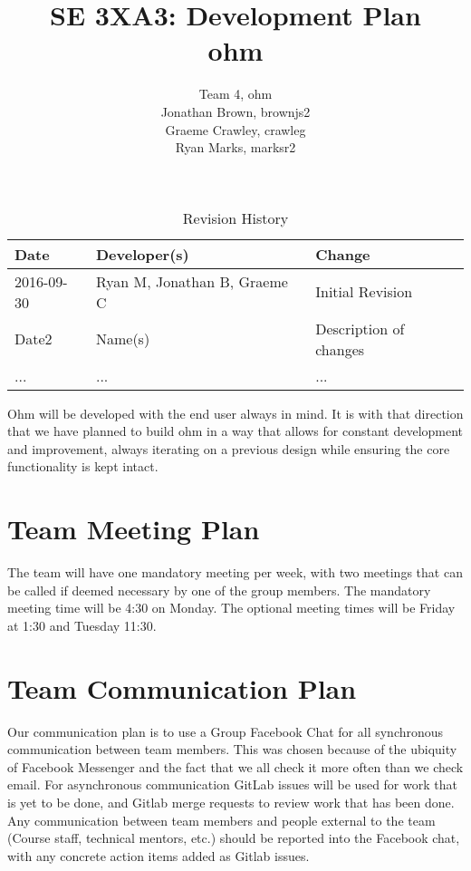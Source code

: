 \documentclass{article}
\title{SE 3XA3: Development Plan \\ohm}
\author{Team 4, ohm
		\\Jonathan Brown, brownjs2
		\\Graeme Crawley, crawleg
		\\Ryan Marks, marksr2
}
\date{}
\begin{document}
\begin{table}[hp]
\caption{Revision History} \label{TblRevisionHistory}
\begin{tabularx}{\textwidth}{llX}
\toprule
\textbf{Date} & \textbf{Developer(s)} & \textbf{Change}\\
\midrule
2016-09-30 & Ryan M, Jonathan B, Graeme C & Initial Revision\\
Date2 & Name(s) & Description of changes\\
... & ... & ...\\
\bottomrule
\end{tabularx}
\end{table}

\newpage

\maketitle

Ohm will be developed with the end user always in mind. It is with that direction that we have planned to build ohm in a way that allows for constant development and improvement, always iterating on a previous design while ensuring the core functionality is kept intact.

\section{Team Meeting Plan}
The team will have one mandatory meeting per week, with two meetings that can be called if deemed necessary by one of the group members. The mandatory meeting time will be 4:30 on Monday. The optional meeting times will be Friday at 1:30 and Tuesday 11:30.

\section{Team Communication Plan}

Our communication plan is to use a Group Facebook Chat for all synchronous communication between team members.
This was chosen because of the ubiquity of Facebook Messenger and the fact that we all check it more often than we check email.
For asynchronous communication GitLab issues will be used for work that is yet to be done, and Gitlab merge requests to review work that has been done.
Any communication between team members and people external to the team (Course staff, technical mentors, etc.) should be reported into the Facebook chat, 
with any concrete action items added as Gitlab issues.
\end{document}
